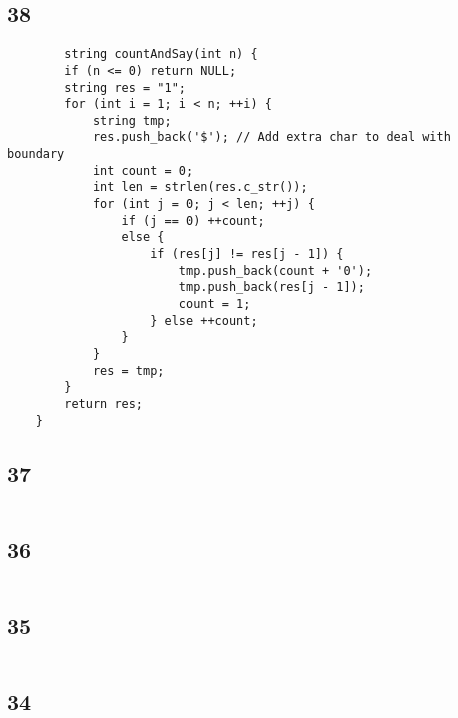 \documentclass[12pt,a4paper]{article}
\begin{document}
	\subsection*{38}
	\begin{lstlisting}
	    string countAndSay(int n) {
        if (n <= 0) return NULL;
        string res = "1";
        for (int i = 1; i < n; ++i) {
            string tmp;
            res.push_back('$'); // Add extra char to deal with boundary
            int count = 0;
            int len = strlen(res.c_str());
            for (int j = 0; j < len; ++j) {
                if (j == 0) ++count;
                else {
                    if (res[j] != res[j - 1]) {
                        tmp.push_back(count + '0');
                        tmp.push_back(res[j - 1]);
                        count = 1;
                    } else ++count;
                }
            }
            res = tmp;
        }
        return res;
    }
	\end{lstlisting}
	
	\subsection*{37}
	\begin{lstlisting}
	\end{lstlisting}
	
	\subsection*{36}
	\begin{lstlisting}
	\end{lstlisting}

	\subsection*{35}
	\begin{lstlisting}
	\end{lstlisting}

	\subsection*{34}
	\begin{lstlisting}
	\end{lstlisting}
	
\end{document}
